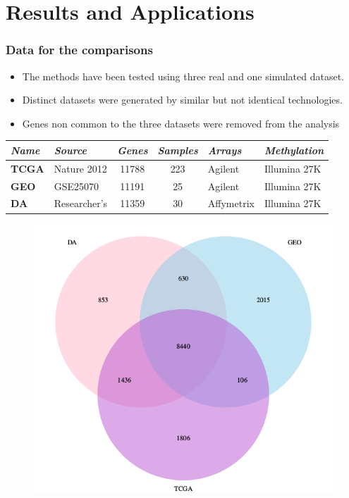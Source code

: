 \documentclass[handout]{beamer}
\begin{document}
\section{Results and Applications}

\begin{frame}[allowframebreaks]
	\frametitle{Data for the comparisons}
	\begin{itemize}
		\item The methods have been tested using three real and one simulated dataset.
		\item Distinct datasets were generated by similar but not identical technologies.
		\item Genes non common to the three datasets were removed from the analysis
	\end{itemize}
\begin{table}[]
	\begin{tabular}{|l|l|c|c|l|l|}
		\hline
		\textit{Name} & \textit{Source} & \multicolumn{1}{l|}{\textit{Genes}} & \multicolumn{1}{l|}{\textit{Samples}} & \textit{Arrays}   & \textit{Methylation} \\ \hline
		\textbf{TCGA} & Nature 2012     & 11788                                & 223      &  Agilent                  &  Illumina 27K                    \\ \hline
		\textbf{GEO}  & GSE25070        & 11191                &  25            & Agilent & Illumina 27K        \\ \hline
		\textbf{DA}   & Researcher's    & 11359                               & 30                                    & Affymetrix & Illumina 27K       \\ \hline
	\end{tabular}
\end{table}	

\framebreak

\begin{center}
	\begin{figure}[h]          
		\includegraphics[height=0.8\textheight]{images/genesInCommonBetweenDatasets.png}
	\end{figure}
\end{center}


\end{frame}
\end{document}
